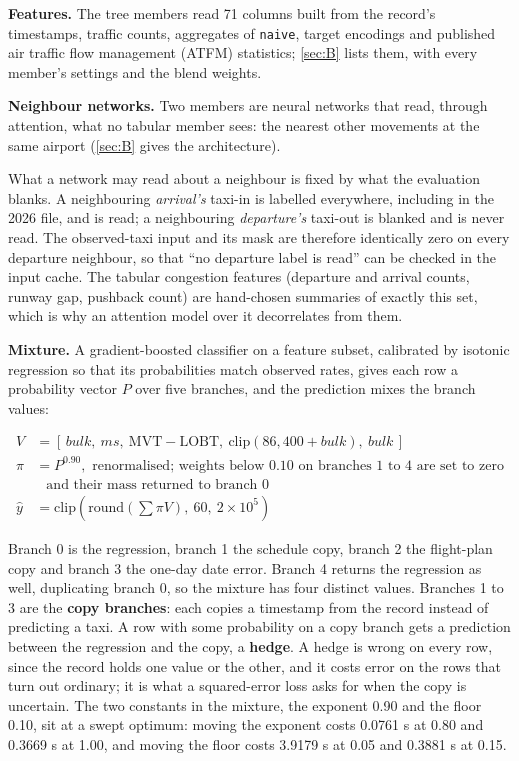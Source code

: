 \documentclass[
  manuscript=article,
  layout=preprint,
  year=2026,
  volume=x,
]{extra/joas}
\begin{document}
\textbf{Features.} The tree members read 71 columns built from the record's timestamps, traffic counts, aggregates of \texttt{naive}, target encodings and published air traffic flow management (ATFM) statistics; \ref{sec:B} lists them, with every member's settings and the blend weights.

\textbf{Neighbour networks.} Two members are neural networks that read, through attention, what no tabular member sees: the nearest other movements at the same airport (\ref{sec:B} gives the architecture).

What a network may read about a neighbour is fixed by what the evaluation blanks. A neighbouring \emph{arrival's} taxi-in is labelled everywhere, including in the 2026 file, and is read; a neighbouring \emph{departure's} taxi-out is blanked and is never read. The observed-taxi input and its mask are therefore identically zero on every departure neighbour, so that ``no departure label is read'' can be checked in the input cache. The tabular congestion features (departure and arrival counts, runway gap, pushback count) are hand-chosen summaries of exactly this set, which is why an attention model over it decorrelates from them.

\textbf{Mixture.} A gradient-boosted classifier on a feature subset, calibrated by isotonic regression so that its probabilities match observed rates, gives each row a probability vector $P$ over five branches, and the prediction mixes the branch values:

\begin{align}
  V &= [\, \mathit{bulk},\ \mathit{ms},\ \mathrm{MVT}-\mathrm{LOBT},\ \mathrm{clip}(86{,}400+\mathit{bulk}),\ \mathit{bulk} \,]
     \label{eq:mixture} \\
  \pi &= P^{0.90}, \text{ renormalised; weights below 0.10 on branches 1 to 4 are set to zero} \nonumber \\
      &\phantom{={}} \text{and their mass returned to branch 0} \nonumber \\
  \hat{y} &= \mathrm{clip}( \mathrm{round}( \textstyle\sum \pi V ),\ 60,\ 2 \times 10^{5} ) \nonumber
\end{align}

Branch 0 is the regression, branch 1 the schedule copy, branch 2 the flight-plan copy and branch 3 the one-day date error. Branch 4 returns the regression as well, duplicating branch 0, so the mixture has four distinct values. Branches 1 to 3 are the \textbf{copy branches}: each copies a timestamp from the record instead of predicting a taxi. A row with some probability on a copy branch gets a prediction between the regression and the copy, a \textbf{hedge}. A hedge is wrong on every row, since the record holds one value or the other, and it costs error on the rows that turn out ordinary; it is what a squared-error loss asks for when the copy is uncertain. The two constants in the mixture, the exponent 0.90 and the floor 0.10, sit at a swept optimum: moving the exponent costs 0.0761 s at 0.80 and 0.3669 s at 1.00, and moving the floor costs 3.9179 s at 0.05 and 0.3881 s at 0.15.
\end{document}
